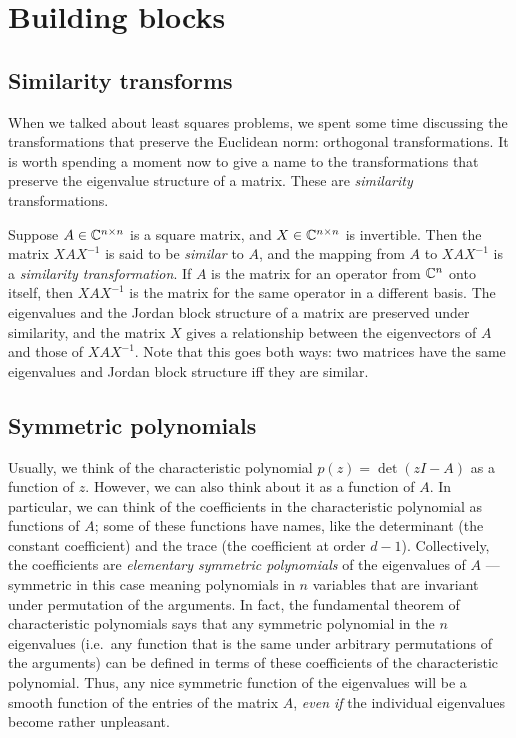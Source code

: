 \documentclass[12pt, leqno]{article} %
\begin{document}

\section{Building blocks}


\subsection{Similarity transforms}

When we talked about least squares problems, we spent some time
discussing the transformations that preserve the Euclidean norm:
orthogonal transformations.  It is worth spending a moment now to give
a name to the transformations that preserve the eigenvalue structure
of a matrix.  These are {\em similarity} transformations.

Suppose $A \in \mathbb{C}^{n \times n}$ is a square matrix, and
$X \in \mathbb{C}^{n \times n}$ is invertible.  Then the matrix $X A X^{-1}$ is
said to be {\em similar} to $A$, and the mapping from $A$ to $X A
X^{-1}$ is a {\em similarity transformation}.  If $A$ is the matrix for
an operator from $\mathbb{C}^n$ onto itself, then $X A X^{-1}$ is the matrix
for the same operator in a different basis.  The eigenvalues and the
Jordan block structure of a matrix are preserved under similarity, and
the matrix $X$ gives a relationship between the eigenvectors of $A$
and those of $X A X^{-1}$.  Note that this goes both ways: two
matrices have the same eigenvalues and Jordan block structure iff they
are similar.

\subsection{Symmetric polynomials}

Usually, we think of the characteristic polynomial $p(z) = \det(zI-A)$
as a function of $z$.  However, we can also think about it as a
function of $A$.  In particular, we can think of the coefficients in
the characteristic polynomial as functions of $A$; some of these
functions have names, like the determinant (the constant coefficient)
and the trace (the coefficient at order $d-1$).  Collectively, the
coefficients are {\em elementary symmetric polynomials} of the
eigenvalues of $A$ --- symmetric in this case meaning polynomials in
$n$ variables that are invariant under permutation of the arguments.
In fact, the fundamental theorem of characteristic polynomials says
that any symmetric polynomial in the $n$ eigenvalues (i.e.~any
function that is the same under arbitrary permutations of the
arguments) can be defined in terms of these coefficients of the
characteristic polynomial.  Thus, any nice symmetric function of the
eigenvalues will be a smooth function of the entries of the matrix
$A$, {\em even if} the individual eigenvalues become rather
unpleasant.
\end{document}
